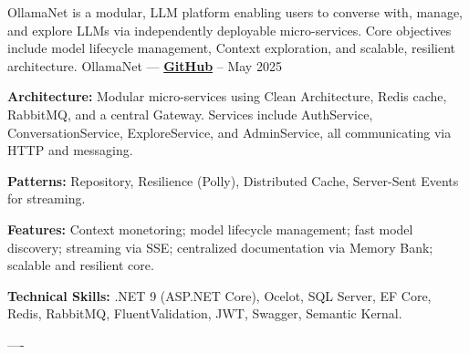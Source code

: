 

\begin{cventries}

\cventry
    {OllamaNet is a modular, LLM platform enabling users to converse with, manage, and explore LLMs
    via independently deployable micro-services.
    Core objectives include model lifecycle management, Context exploration, and scalable, resilient architecture.}
    {OllamaNet — \href{https://github.com/ollamaNet/OllamaNet-Architecture}{\color{midnightblue}\textbf{GitHub}} \textrm{\faArrowRight}}
    {--}
    {May 2025}
    {
      \begin{cvitems}
        \item \textbf{Architecture:}{ Modular micro-services using Clean Architecture, Redis cache, RabbitMQ, and a central Gateway.
                                      Services include AuthService, ConversationService, ExploreService, and AdminService, 
                                      all communicating via HTTP and messaging.}
        \item \textbf{Patterns:}{ Repository, Resilience (Polly), Distributed Cache, Server-Sent Events for streaming.}
        \item \textbf{Features:}{ Context monetoring; model lifecycle management; fast model discovery; streaming via SSE; centralized documentation via Memory Bank; scalable and resilient core.}
        \item \textbf{Technical Skills:}{ .NET 9 (ASP.NET Core), Ocelot, SQL Server, EF Core, Redis, RabbitMQ, FluentValidation, JWT, Swagger, Semantic Kernal.}
      \end{cvitems}
    }
    \begin{singlespace}
----
\end{singlespace}



\end{cventries}
